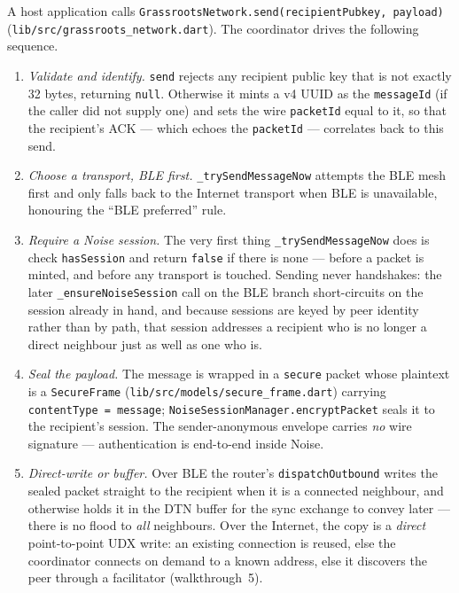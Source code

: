 \documentclass[11pt]{report}
\newcommand{\code}[1]{\texttt{\small #1}}
\begin{document}
A host application calls
\code{GrassrootsNetwork.send(recipientPubkey, payload)}
(\code{lib/src/grassroots\_network.dart}). The coordinator drives the following
sequence.

\begin{enumerate}
  \item \emph{Validate and identify.} \code{send} rejects any recipient public
    key that is not exactly 32 bytes, returning \code{null}. Otherwise it mints
    a v4 UUID as the \code{messageId} (if the caller did not supply one) and
    sets the wire \code{packetId} equal to it, so that the recipient's ACK ---
    which echoes the \code{packetId} --- correlates back to this send.
  \item \emph{Choose a transport, BLE first.} \code{\_trySendMessageNow}
    attempts the BLE mesh first and only falls back to the Internet transport
    when BLE is unavailable, honouring the ``BLE preferred'' rule.
  \item \emph{Require a Noise session.} The very first thing
    \code{\_trySendMessageNow} does is check \code{hasSession} and return
    \code{false} if there is none --- before a packet is minted, and before any
    transport is touched. Sending never handshakes: the later
    \code{\_ensureNoiseSession} call on the BLE branch short-circuits on the
    session already in hand, and because sessions are keyed by peer identity
    rather than by path, that session addresses a recipient who is no longer a
    direct neighbour just as well as one who is.
  \item \emph{Seal the payload.} The message is wrapped in a
    \code{secure} packet whose plaintext is a \code{SecureFrame}
    (\code{lib/src/models/secure\_frame.dart}) carrying
    \code{contentType = message}; \code{NoiseSessionManager.encryptPacket} seals
    it to the recipient's session. The sender-anonymous envelope carries
    \emph{no} wire signature --- authentication is end-to-end inside Noise.
  \item \emph{Direct-write or buffer.} Over BLE the router's
    \code{dispatchOutbound} writes the sealed packet straight to the recipient
    when it is a connected neighbour, and otherwise holds it in the DTN buffer
    for the sync exchange to convey later --- there is no flood to \emph{all}
    neighbours. Over the Internet, the copy is a \emph{direct}
    point-to-point UDX write: an existing connection is reused, else the
    coordinator connects on demand to a known address, else it discovers the
    peer through a facilitator (walkthrough~5).

\end{enumerate}
\end{document}
